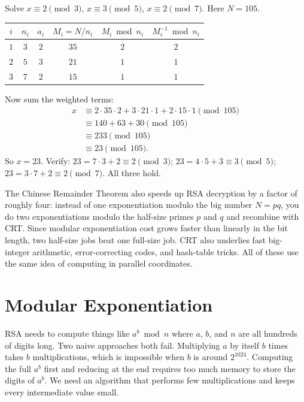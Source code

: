 \begin{example}
\label{ch30:ex-crt}
Solve $x \equiv 2 \pmod 3$, $x \equiv 3 \pmod 5$, $x \equiv 2 \pmod 7$. Here
$N = 105$.
\begin{center}
\begin{tabular}{c c c c c c}
\toprule
$i$ & $n_i$ & $a_i$ & $M_i = N/n_i$ & $M_i \bmod n_i$ & $M_i^{-1} \bmod n_i$ \\
\midrule
$1$ & $3$ & $2$ & $35$ & $2$ & $2$ \\
$2$ & $5$ & $3$ & $21$ & $1$ & $1$ \\
$3$ & $7$ & $2$ & $15$ & $1$ & $1$ \\
\bottomrule
\end{tabular}
\end{center}
Now sum the weighted terms:
\begin{align*}
  x &\equiv 2\cdot 35\cdot 2 + 3\cdot 21\cdot 1 + 2\cdot 15\cdot 1 \pmod{105} \\
    &\equiv 140 + 63 + 30 \pmod{105} \\
    &\equiv 233 \pmod{105} \\
    &\equiv 23 \pmod{105}.
\end{align*}
So $x = 23$. Verify: $23 = 7\cdot3 + 2 \equiv 2 \pmod 3$; $23 = 4\cdot5 + 3
\equiv 3 \pmod 5$; $23 = 3\cdot7 + 2 \equiv 2 \pmod 7$. All three hold.
\end{example}

\begin{aestheticbox}
The Chinese Remainder Theorem also speeds up RSA decryption by a factor of roughly
four: instead of one exponentiation modulo the big number $N = pq$, you do two
exponentiations modulo the half-size primes $p$ and $q$ and recombine with CRT.
Since modular exponentiation cost grows faster than linearly in the bit length,
two half-size jobs beat one full-size job. CRT also underlies fast big-integer
arithmetic, error-correcting codes, and hash-table tricks. All of these use the same idea of
computing in parallel coordinates.
\end{aestheticbox}

\section{Modular Exponentiation}
\label{ch30:modexp}

RSA needs to compute things like $a^{b} \bmod n$ where $a$, $b$, and $n$ are all
hundreds of digits long. Two naive approaches both fail. Multiplying
$a$ by itself $b$ times takes $b$ multiplications, which is impossible when $b$ is around $2^{1024}$. Computing the full
$a^b$ first and reducing at the end requires too much memory to store the digits of $a^b$. We need an algorithm that performs few multiplications and keeps every intermediate value small.

